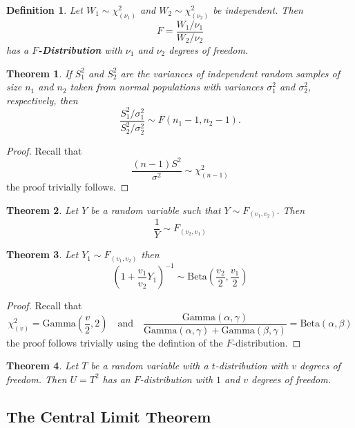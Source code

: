 \documentclass[a4paper,12pt]{article}
\theoremstyle{nonitalic}
\newtheorem{definition}{Definition}[subsection]
\newtheorem{theorem}{Theorem}[subsection]
\begin{document}
    \begin{definition}
        Let \( W_1 \sim \chi^2_{(\nu_1)} \) and \( W_2 \sim \chi^2_{(\nu_2)} \) be independent. Then
        \[
            F = \frac{W_1 / \nu_1}{W_2 / \nu_2}
        \]
        has a \textbf{\( F \)-Distribution} with \( \nu_1 \) and \( \nu_2 \) degrees of freedom.
    \end{definition}

    \begin{theorem}
        If \( S_1^2 \) and \( S_2^2 \) are the variances of independent random samples of size \( n_1 \) and \( n_2 \) taken from normal populations with variances \( \sigma_1^2 \) and \( \sigma_2^2 \), respectively, then
        \[
        \frac{S_1^2 / \sigma_1^2}{S_2^2 / \sigma_2^2} \sim F(n_1 - 1, n_2 - 1).
        \]        
    \end{theorem}

    \begin{proof}
        Recall that
        \[
            \frac{(n-1)S^2}{\sigma^2} \sim \chi^2_{(n-1)}
        \]
        the proof trivially follows.
    \end{proof}
    
    \begin{theorem}
        Let $Y$ be a random variable such that $Y \sim F_{(v_1, v_2)}$. Then
        \[
            \frac{1}{Y} \sim F_{(v_2, v_1)}
        \]
    \end{theorem}

    \begin{theorem}
        Let $Y_1 \sim F_{(v_1, v_2)}$ then
        \[
            \left(1 + \frac{v_1}{v_2}Y_1\right)^{-1} \sim \text{Beta}\left(\frac{v_2}{2}, \frac{v_1}{2}\right)
        \]
    \end{theorem}
    
    \begin{proof}
        Recall that
        \[
            \chi^2_{(v)} = \text{Gamma}\left(\frac{v}{2}, 2\right) \quad \text{and} \quad \frac{\text{Gamma}(\alpha, \gamma)}{\text{Gamma}(\alpha, \gamma) + \text{Gamma}(\beta, \gamma)} = \text{Beta}(\alpha, \beta)
        \]
        the proof follows trivially using the defintion of the $F$-distribution.
    \end{proof}

    \begin{theorem}
        Let $T$ be a random variable with a $t$-distribution with $v$ degrees of freedom. Then $U = T^2$ has an $F$-distribution with $1$ and $v$ degrees of freedom.
    \end{theorem}

    \newpage

    \subsection{The Central Limit Theorem}

    
\end{document}
